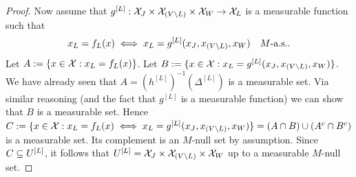 \begin{proof}
  Now assume that $g^{[L]}: \mathcal{X}_{J} \times \mathcal{X}_{(V\setminus L)} \times \mathcal{X}_{W} \to \mathcal{X}_L$ is a measurable function such that
    $$x_L = f_L(x) \iff x_L = g^{[L]}(x_J,x_{(V\setminus L)},x_W)\quad M\text{-a.s.}.$$
  Let $A := \{x \in \mathcal{X} : x_L = f_L(x)\}$.
  Let $B := \{x \in \mathcal{X} : x_L = g^{[L]}(x_J,x_{(V\setminus L)},x_W)\}$.
  We have already seen that $A = (h^{[L]})^{-1}(\Delta^{[L]})$ is a measurable set.
  Via similar reasoning (and the fact that $g^{[L]}$ is a measurable function) we can show that $B$ is a measurable set. 
  Hence $C := \{x \in \mathcal{X} : x_L = f_L(x) \iff x_L = g^{[L]}(x_J,x_{(V\setminus L)},x_W)\} = (A \cap B) \cup (A^c \cap B^c)$ is a measurable set.
  Its complement is an $M$-null set by assumption.
  Since $C \subseteq U^{[L]}$, it follows that $U^{[L]} = \mathcal{X}_J \times \mathcal{X}_{(V\setminus L)} \times \mathcal{X}_W$ up to a measurable $M$-null set.
\end{proof}
